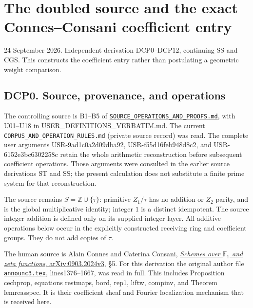 \section{The doubled source and the exact Connes--Consani coefficient
entry}\label{the-doubled-source-and-the-exact-connesconsani-coefficient-entry}

24 September 2026. Independent derivation DCP0--DCP12, continuing SS and
CGS. This constructs the coefficient entry rather than postulating a
geometric weight comparison.

\subsection{DCP0. Source, provenance, and
operations}\label{dcp0.-source-provenance-and-operations}

The controlling source is B1--B5 of
\href{../foundations/user_definitions_20260924/SOURCE_OPERATIONS_AND_PROOFS.md}{\nolinkurl{SOURCE_OPERATIONS_AND_PROOFS.md}},
with U01--U18 in
{USER\_DEFINITIONS\_VERBATIM.md}.
The current \nolinkurl{CORPUS_AND_OPERATION_RULES.md} (private source record) was read. The complete
user arguments USR-9ad1c0a2d09dba92, USR-f55d16feb948d8c2, and
USR-6152e3bc6302258c retain the whole arithmetic reconstruction before
subsequent coefficient operations. Those arguments were consulted in the
earlier source derivations ST and SS; the present calculation does not
substitute a finite prime system for that reconstruction.

The source remains \(S=\mathbb Z\cup\{\tau\}\): primitive \(Z_1/\tau\)
has no addition or \(Z_2\) parity, and is the global multiplicative
identity; integer \(1\) is a distinct idempotent. The source integer
addition is defined only on its supplied integer layer. All additive
operations below occur in the explicitly constructed receiving ring and
coefficient groups. They do not add copies of \(\tau\).

The human source is Alain Connes and Caterina Consani,
\href{https://arxiv.org/abs/0903.2024v3}{\emph{Schemes over
\(\mathbb F_1\) and zeta functions}, arXiv:0903.2024v3}, §5. For this
derivation the original author file
\href{https://arxiv.org/abs/0903.2024v3}{\nolinkurl{announc3.tex}},
lines1376--1667, was read in full. This includes Proposition cechprop,
equations restmaps, bord, rep1, liftw, compinv, and Theorem lemreasspec.
It is their coefficient sheaf and Fourier localization mechanism that is
received here.

